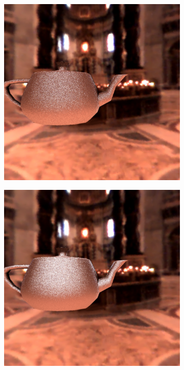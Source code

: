 \documentclass[acmsmall]{acmart}
\begin{document}
\begin{figure}[h]
    \centering
    
\begin{subfigure}{.3\textwidth}
  \centering
  \includegraphics[width=.9\linewidth]{img/10.png}
\end{subfigure}%
\begin{subfigure}{.3\textwidth}
  \centering
  \includegraphics[width=.9\linewidth]{img/50.png}

\end{subfigure}
\end{figure}
\end{document}
